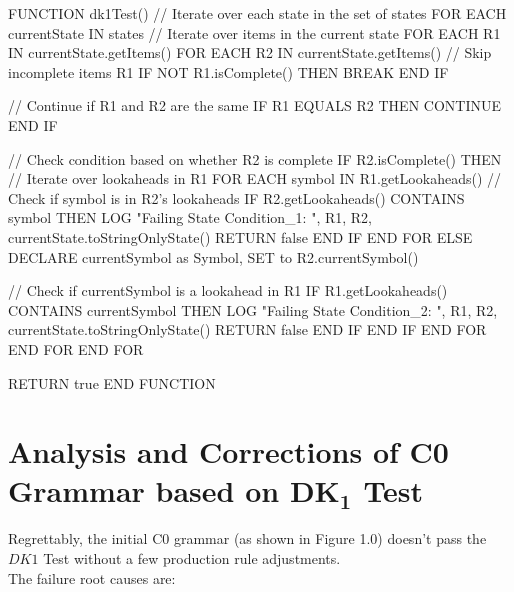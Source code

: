 \begin{codeblock}
    FUNCTION dk1Test()
    // Iterate over each state in the set of states
    FOR EACH currentState IN states
    // Iterate over items in the current state
    FOR EACH R1 IN currentState.getItems()
    FOR EACH R2 IN currentState.getItems()
    // Skip incomplete items R1
    IF NOT R1.isComplete() THEN
    BREAK
    END IF

    // Continue if R1 and R2 are the same
    IF R1 EQUALS R2 THEN
    CONTINUE
    END IF

    // Check condition based on whether R2 is complete
    IF R2.isComplete() THEN
    // Iterate over lookaheads in R1
    FOR EACH symbol IN R1.getLookaheads()
    // Check if symbol is in R2's lookaheads
    IF R2.getLookaheads() CONTAINS symbol THEN
    LOG "Failing State Condition_1: ", R1, R2, currentState.toStringOnlyState()
    RETURN false
    END IF
    END FOR
    ELSE
    DECLARE currentSymbol as Symbol, SET to R2.currentSymbol()

    // Check if currentSymbol is a lookahead in R1
    IF R1.getLookaheads() CONTAINS currentSymbol THEN
    LOG "Failing State Condition_2: ", R1, R2, currentState.toStringOnlyState()
    RETURN false
    END IF
    END IF
    END FOR
    END FOR
    END FOR

    RETURN true
    END FUNCTION
\end{codeblock}

\newpage


\section{Analysis and Corrections of C0 Grammar based on \(\boldsymbol{DK_{1}}\) Test}\label{sec:Analysis and Corrections of C0 Grammar based on DK1 Test}

Regrettably, the initial C0 grammar (as shown in Figure 1.0) doesn’t pass the \(DK1\) Test without a few production rule adjustments.\\

The failure root causes are:

